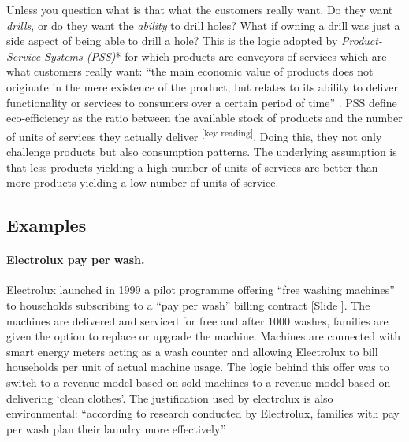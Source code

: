 \documentclass{article}
\newcounter{slide}
\begin{document}
Unless you question what is that what the customers really want. Do they want \emph{drills}, or do they want the \emph{ability} to drill holes? What if owning a drill was just a side aspect of being able to drill a hole? This is the logic adopted by \emph{Product-Service-Systems (PSS)}* for which products are conveyors of services which are what customers really want: ``the main economic value of products does not originate in the mere existence of the product, but relates to its ability to deliver functionality or services to consumers over a certain period of time'' \cite{tukkerEightTypesProduct2004}. PSS define eco-efficiency as the ratio between the available stock of products and the number of units of services they actually deliver \cite{meijkampChangingConsumerBehaviour1999}\textsuperscript{\color{Magenta}[key reading]}. Doing this, they not only challenge products but also consumption patterns. The underlying assumption is that less products yielding a high number of units of services are better than more products yielding a low number of units of service. 

\subsection{Examples}
\label{sec:pssExamples}

\paragraph{Electrolux pay per wash.}\label{Electrolux}
Electrolux launched in 1999 a pilot programme offering ``free washing machines'' to households subscribing to a ``pay per wash'' billing contract \href{https://www.electroluxgroup.com/en/electrolux-offers-7000-households-free-washing-machines-1885/}{\cite{eletroluxElectroluxOffers0001999}} {\color{blue}[Slide ]}. The machines are delivered and serviced for free and after 1000 washes, families are given the option to replace or upgrade the machine. Machines are connected with smart energy meters acting as a wash counter and allowing Electrolux to bill households per unit of actual machine usage. The logic behind this offer was to switch to a revenue model based on sold machines to a revenue model based on delivering `clean clothes'. The justification used by electrolux is also environmental: ``according to research conducted by Electrolux, families with pay per wash plan their laundry more effectively.''
\end{document}
